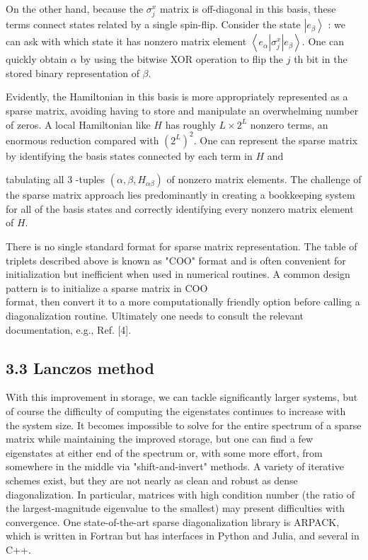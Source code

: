 \documentclass[10pt]{article}
\begin{document}
On the other hand, because the $\sigma_{j}^{x}$ matrix is off-diagonal in this basis, these terms connect states related by a single spin-flip. Consider the state $\left|e_{\beta}\right\rangle$ : we can ask with which state it has nonzero matrix element $\left\langle e_{\alpha}\left|\sigma_{j}^{x}\right| e_{\beta}\right\rangle$. One can quickly obtain $\alpha$ by using the bitwise XOR operation to flip the $j$ th bit in the stored binary representation of $\beta$.

Evidently, the Hamiltonian in this basis is more appropriately represented as a sparse matrix, avoiding having to store and manipulate an overwhelming number of zeros. A local Hamiltonian like $H$ has roughly $L \times 2^{L}$ nonzero terms, an enormous reduction compared with $\left(2^{L}\right)^{2}$. One can represent the sparse matrix by identifying the basis states connected by each term in $H$ and

tabulating all 3 -tuples $\left(\alpha, \beta, H_{\alpha \beta}\right)$ of nonzero matrix elements. The challenge of the sparse matrix approach lies predominantly in creating a bookkeeping system for all of the basis states and correctly identifying every nonzero matrix element of $H$.

There is no single standard format for sparse matrix representation. The table of triplets described above is known as "COO" format and is often convenient for initialization but inefficient when used in numerical routines. A common design pattern is to initialize a sparse matrix in COO\\
format, then convert it to a more computationally friendly option before calling a diagonalization routine. Ultimately one needs to consult the relevant documentation, e.g., Ref. [4].

\subsection*{3.3 Lanczos method}
With this improvement in storage, we can tackle significantly larger systems, but of course the difficulty of computing the eigenstates continues to increase with the system size. It becomes impossible to solve for the entire spectrum of a sparse matrix while maintaining the improved storage, but one can find a few eigenstates at either end of the spectrum or, with some more effort, from somewhere in the middle via "shift-and-invert" methods. A variety of iterative schemes exist, but they are not nearly as clean and robust as dense diagonalization. In particular, matrices with high condition number (the ratio of the largest-magnitude eigenvalue to the smallest) may present difficulties with convergence. One state-of-the-art sparse diagonalization library is ARPACK, which is written in Fortran but has interfaces in Python and Julia, and several in C++.
\end{document}
